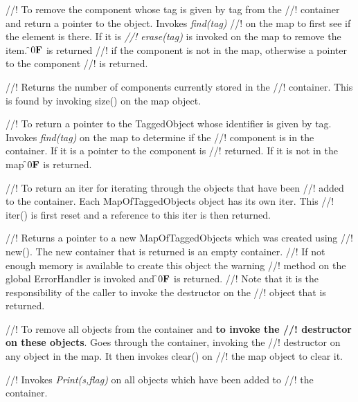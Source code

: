 //! To remove the component whose tag is given by \p tag from the
//! container and return a pointer to the object. Invokes {\em find(tag)}
//! on the map to first see if the element is there. If it is {\em
//! erase(tag)} is invoked on the map to remove the item. \f$0{\bf F}$ is returned
//! if the component is not in the map, otherwise a pointer to the component
//! is returned.

//! Returns the number of components currently stored in the
//! container. This is found by invoking size() on the map object.

//! To return a pointer to the TaggedObject whose identifier is given by
\p tag. Invokes {\em find(tag)} on the map to determine if the
//! component is in the container. If it is a pointer to the component is
//! returned. If it is not in the map \f$0{\bf F}$ is returned.

//! To return an iter for iterating through the objects that have been
//! added to the container. Each MapOfTaggedObjects object has its own iter. This
//! iter() is first reset and a reference to this iter is then returned. 

//! Returns a pointer to a new MapOfTaggedObjects which was created using
//! new(). The new container that is returned is an empty container.
//! If not enough memory is available to create this object the warning
//! method on the global ErrorHandler is invoked and \f$0{\bf F}$ is returned.
//! Note that it is the responsibility of the caller to invoke the destructor on the
//! object that is returned.


//! To remove all objects from the container and {\bf to invoke the
//! destructor on these objects}. Goes through the container, invoking the
//! destructor on any object in the map. It then invokes clear() on
//! the map object to clear it.

//! Invokes {\em Print(s,flag)} on all objects which have been added to
//! the container. 






